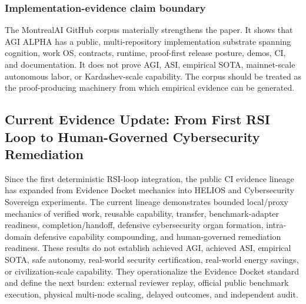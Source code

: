 \subsubsection{Implementation-evidence claim
boundary}\label{implementation-evidence-claim-boundary}

The MontrealAI GitHub corpus materially strengthens the paper. It shows
that AGI ALPHA has a public, multi-repository implementation substrate
spanning cognition, work OS, contracts, runtime, proof-first release
posture, demos, CI, and documentation. It does not prove AGI, ASI,
empirical SOTA, mainnet-scale autonomous labor, or Kardashev-scale
capability. The corpus should be treated as the proof-producing
machinery from which empirical evidence can be generated.

\subsection{Current Evidence Update: From First RSI Loop to
Human-Governed Cybersecurity
Remediation}\label{current-evidence-update-from-first-rsi-loop-to-human-governed-cybersecurity-remediation}

Since the first deterministic RSI-loop integration, the public CI
evidence lineage has expanded from Evidence Docket mechanics into HELIOS
and Cybersecurity Sovereign experiments. The current lineage
demonstrates bounded local/proxy mechanics of verified work, reusable
capability, transfer, benchmark-adapter readiness, completion/handoff,
defensive cybersecurity organ formation, intra-domain defensive
capability compounding, and human-governed remediation readiness. These
results do not establish achieved AGI, achieved ASI, empirical SOTA,
safe autonomy, real-world security certification, real-world energy
savings, or civilization-scale capability. They operationalize the
Evidence Docket standard and define the next burden: external reviewer
replay, official public benchmark execution, physical multi-node
scaling, delayed outcomes, and independent audit.

